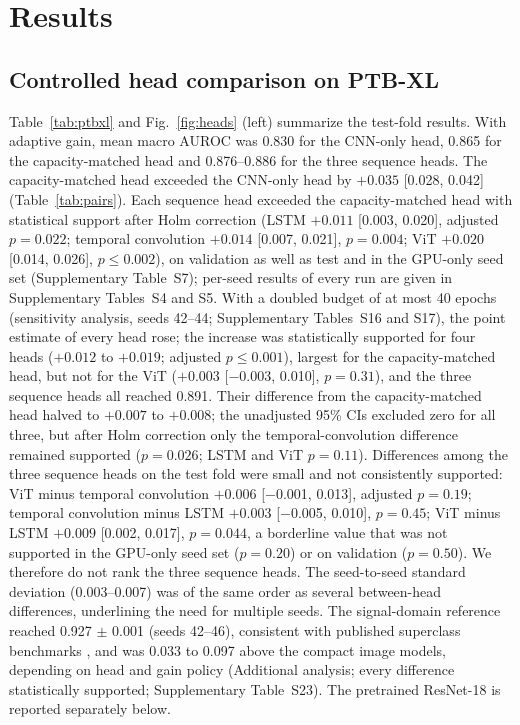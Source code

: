 \documentclass{wlscirep}
\begin{document}
\section*{Results}

\subsection*{Controlled head comparison on PTB-XL}
Table~\ref{tab:ptbxl} and Fig.~\ref{fig:heads} (left) summarize the test-fold results. With adaptive gain, mean macro AUROC was 0.830 for the CNN-only head, 0.865 for the capacity-matched head and 0.876--0.886 for the three sequence heads. The capacity-matched head exceeded the CNN-only head by $+0.035$ [0.028, 0.042] (Table~\ref{tab:pairs}). Each sequence head exceeded the capacity-matched head with statistical support after Holm correction (LSTM $+0.011$ [0.003, 0.020], adjusted $p=0.022$; temporal convolution $+0.014$ [0.007, 0.021], $p=0.004$; ViT $+0.020$ [0.014, 0.026], $p\le0.002$), on validation as well as test and in the GPU-only seed set (Supplementary Table~S7); per-seed results of every run are given in Supplementary Tables~S4 and S5. With a doubled budget of at most 40 epochs (sensitivity analysis, seeds 42--44; Supplementary Tables~S16 and S17), the point estimate of every head rose; the increase was statistically supported for four heads ($+0.012$ to $+0.019$; adjusted $p\le0.001$), largest for the capacity-matched head, but not for the ViT ($+0.003$ [$-$0.003, 0.010], $p=0.31$), and the three sequence heads all reached 0.891. Their difference from the capacity-matched head halved to $+0.007$ to $+0.008$; the unadjusted 95\% CIs excluded zero for all three, but after Holm correction only the temporal-convolution difference remained supported ($p=0.026$; LSTM and ViT $p=0.11$). Differences among the three sequence heads on the test fold were small and not consistently supported: ViT minus temporal convolution $+0.006$ [$-$0.001, 0.013], adjusted $p=0.19$; temporal convolution minus LSTM $+0.003$ [$-$0.005, 0.010], $p=0.45$; ViT minus LSTM $+0.009$ [0.002, 0.017], $p=0.044$, a borderline value that was not supported in the GPU-only seed set ($p=0.20$) or on validation ($p=0.50$). We therefore do not rank the three sequence heads. The seed-to-seed standard deviation (0.003--0.007) was of the same order as several between-head differences, underlining the need for multiple seeds. The signal-domain reference reached 0.927 $\pm$ 0.001 (seeds 42--46), consistent with published superclass benchmarks \cite{strodthoff2021benchmark}, and was 0.033 to 0.097 above the compact image models, depending on head and gain policy (Additional analysis; every difference statistically supported; Supplementary Table~S23). The pretrained ResNet-18 is reported separately below.
\end{document}
